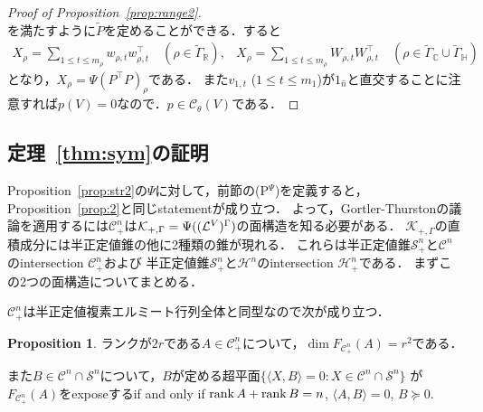 \documentclass[11pt]{article}
\theoremstyle{definition}
\newtheorem{prop}[defi]{Proposition}
\begin{document}
\begin{proof}[Proof of Proposition~\ref{prop:range2}]
\[        \]
        を満たすように$\tilde{P}$を定めることができる．すると
        \[
        \begin{array}{ll}
            X_\rho = \sum_{1 \leq t \leq m_\rho} w_{\rho,t} w_{\rho,t}^\top \quad (\rho \in \tilde{\Gamma}_\mathbb{R}), &
            X_\rho = \sum_{1 \leq t \leq m_\rho} W_{\rho,t} W_{\rho,t}^\top \quad (\rho \in \tilde{\Gamma}_\mathbb{C} \cup \tilde{\Gamma}_\mathbb{H})
        \end{array}
        \]
        となり，$X_\rho=\Psi(P^\top P)_\rho$である．
        また$v_{1,t}$ ($1 \leq t\leq m_1$)が$1_{\hat{n}}$と直交することに注意すれば$p(V)=0$なので．$p \in \mathcal{C}_\theta(V)$である．
    \end{proof}

\subsection{定理~\ref{thm:sym}の証明}
    Proposition~\ref{prop:str2}の$\Psi$に対して，前節の(P$^\Psi$)を定義すると，Proposition~\ref{prop:2}と同じstatementが成り立つ．
    よって，Gortler-Thurstonの議論を適用するには$\mathcal{C}^n_+$は$\mathcal{K}_{+,\Gamma} = \Psi(({\cal L}^V)^\Gamma)$の面構造を知る必要がある．
    $\mathcal{K}_{+,\Gamma}$の直積成分には半正定値錐の他に2種類の錐が現れる．
    これらは半正定値錐$\mathcal{S}^n_+$と$\mathcal{C}^n$のintersection $\mathcal{C}^n_+$および
    半正定値錐$\mathcal{S}^n_+$と$\mathcal{H}^n$のintersection $\mathcal{H}^n_+$である．
    まずこの2つの面構造についてまとめる．

    $\mathcal{C}^n_+$は半正定値複素エルミート行列全体と同型なので次が成り立つ．
    \begin{prop}\label{prop:cface}
        ランクが$2r$である$A \in \mathcal{C}^n_+$について，$\dim F_{\mathcal{C}^n_+}(A)=r^2$である．

        また$B \in \mathcal{C}^n \cap \mathcal{S}^n$について，$B$が定める超平面$\{ \langle X,B \rangle=0 : X \in \mathcal{C}^n \cap \mathcal{S}^n\}$
        が$F_{\mathcal{C}^n_+}(A)$をexposeするif and only if
        $\rank A + \rank B = n$, $\langle A,B \rangle=0$, $B \succeq 0$.
    \end{prop}
\end{document}
